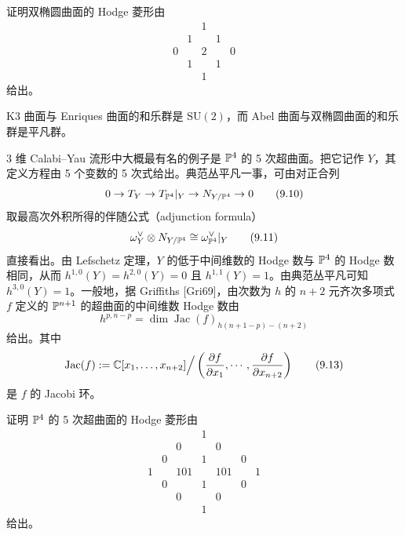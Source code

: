 \begin{exercise}
证明双椭圆曲面的 Hodge 菱形由
\begin{equation}
  \begin{array}{ccccc}
    & & 1 & & \\
    & 1 & & 1 & \\
    0 & & 2 & & 0\\
    & 1 & & 1 & \\
    & & 1 & &
  \end{array}
  \tag{9.9}
\end{equation}
给出。
\end{exercise}

K3 曲面与 Enriques 曲面的和乐群是 $\mathrm{SU}(2)$，而 Abel 曲面与双椭圆曲面的和乐群是平凡群。

3 维 Calabi--Yau 流形中大概最有名的例子是 $\mathbb{P}^4$ 的 5 次超曲面。把它记作 $Y$，其定义方程由 5 个变数的 5 次式给出。典范丛平凡一事，可由对正合列
\begin{equation}
  0\to T_Y\to T_{\mathbb{P}^4}|_Y\to N_{Y/\mathbb{P}^4}\to 0
  \tag{9.10}
\end{equation}
取最高次外积所得的伴随公式（adjunction formula）
\begin{equation}
  \omega_Y^\vee\otimes N_{Y/\mathbb{P}^4}\cong\omega_{\mathbb{P}^4}^\vee|_Y
  \tag{9.11}
\end{equation}
直接看出。由 Lefschetz 定理，$Y$ 的低于中间维数的 Hodge 数与 $\mathbb{P}^4$ 的 Hodge 数相同，从而 $h^{1,0}(Y)=h^{2,0}(Y)=0$ 且 $h^{1,1}(Y)=1$。由典范丛平凡可知 $h^{3,0}(Y)=1$。一般地，据 Griffiths [Gri69]，由次数为 $h$ 的 $n+2$ 元齐次多项式 $f$ 定义的 $\mathbb{P}^{n+1}$ 的超曲面的中间维数 Hodge 数由
\begin{equation}
  h^{p,n-p}=\dim\operatorname{Jac}(f)_{h(n+1-p)-(n+2)}
  \tag{9.12}
\end{equation}
给出。其中
\begin{equation}
  \operatorname{Jac}(f):=\mathbb{C}[x_1,\ldots,x_{n+2}]\Big/\left(\frac{\partial f}{\partial x_1},\cdots,\frac{\partial f}{\partial x_{n+2}}\right)
  \tag{9.13}
\end{equation}
是 $f$ 的 Jacobi 环。

\begin{exercise}
证明 $\mathbb{P}^4$ 的 5 次超曲面的 Hodge 菱形由
\begin{equation}
  \begin{array}{ccccccc}
    & & & 1 & & & \\
    & & 0 & & 0 & & \\
    & 0 & & 1 & & 0 & \\
    1 & & 101 & & 101 & & 1\\
    & 0 & & 1 & & 0 & \\
    & & 0 & & 0 & & \\
    & & & 1 & & &
  \end{array}
  \tag{9.14}
\end{equation}
给出。
\end{exercise}

